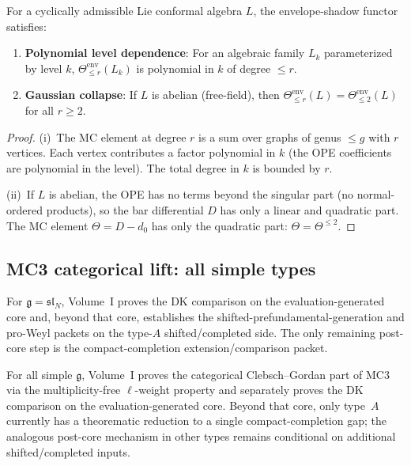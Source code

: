 \begin{proposition}
For a cyclically admissible Lie conformal algebra $L$, the
envelope-shadow functor satisfies:
\begin{enumerate}[label=\textup{(\roman*)}]
\item \textbf{Polynomial level dependence}: For an algebraic family
 $L_k$ parameterized by level $k$, $\Theta^{\mathrm{env}}_{\le r}(L_k)$
 is polynomial in $k$ of degree $\le r$.
\item \textbf{Gaussian collapse}: If $L$ is abelian (free-field), then
 $\Theta^{\mathrm{env}}_{\le r}(L) = \Theta^{\mathrm{env}}_{\le 2}(L)$
 for all $r \ge 2$.
\end{enumerate}
\end{proposition}

\begin{proof}
(i)~The MC element at degree $r$ is a sum over graphs of genus $\le g$
with $r$ vertices. Each vertex contributes a factor polynomial in $k$
(the OPE coefficients are polynomial in the level). The total degree
in $k$ is bounded by $r$.

(ii)~If $L$ is abelian, the OPE has no terms beyond the singular part
(no normal-ordered products), so the bar differential $D$ has only a
linear and quadratic part. The MC element $\Theta = D - d_0$ has only
the quadratic part: $\Theta = \Theta^{\le 2}$.
\end{proof}


\subsection{MC3 categorical lift: all simple types}

\begin{theorem}
For $\mathfrak{g} = \mathfrak{sl}_N$, Volume~I proves the DK
comparison on the evaluation-generated core and, beyond that core,
establishes the shifted-prefundamental-generation and pro-Weyl
packets on the type-$A$ shifted/completed side. The only remaining
post-core step is the compact-completion extension/comparison packet.
\end{theorem}

\begin{theorem}
For all simple $\mathfrak{g}$, Volume~I proves the categorical
Clebsch--Gordan part of MC3 via the multiplicity-free
$\ell$-weight property and separately proves the DK comparison on the
evaluation-generated core. Beyond that core, only type~$A$ currently
has a theorematic reduction to a single compact-completion gap; the
analogous post-core mechanism in other types remains conditional on
additional shifted/completed inputs.
\end{theorem}

